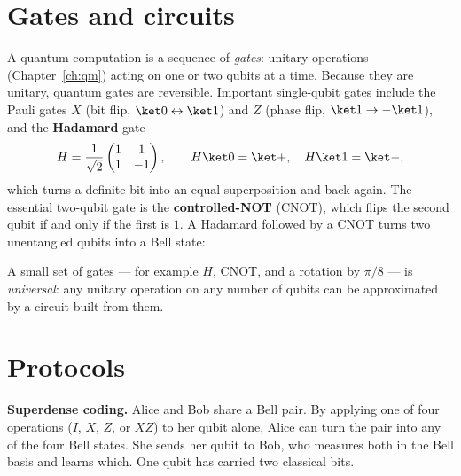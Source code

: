 \section{Gates and circuits}

A quantum computation is a sequence of \emph{gates}: unitary operations (Chapter~\ref{ch:qm}) acting on one or two qubits at a time. Because they are unitary, quantum gates are reversible. Important single-qubit gates include the Pauli gates $X$ (bit flip, $\ket0\leftrightarrow\ket1$) and $Z$ (phase flip, $\ket1\to-\ket1$), and the \textbf{Hadamard} gate
\[
  H = \frac{1}{\sqrt2}\begin{pmatrix}1&1\\1&-1\end{pmatrix},\qquad H\ket0 = \ket+,\quad H\ket1 = \ket- ,
\]
which turns a definite bit into an equal superposition and back again. The essential two-qubit gate is the \textbf{controlled-NOT} (CNOT), which flips the second qubit if and only if the first is $1$. A Hadamard followed by a CNOT turns two unentangled qubits into a Bell state:

\begin{center}
\end{center}

A small set of gates --- for example $H$, CNOT, and a rotation by $\pi/8$ --- is \emph{universal}: any unitary operation on any number of qubits can be approximated by a circuit built from them.

\section{Protocols}

\textbf{Superdense coding.} Alice and Bob share a Bell pair. By applying one of four operations ($I$, $X$, $Z$, or $XZ$) to her qubit alone, Alice can turn the pair into any of the four Bell states. She sends her qubit to Bob, who measures both in the Bell basis and learns which. One qubit has carried two classical bits.

